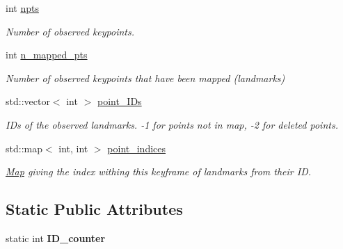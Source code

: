 \begin{DoxyCompactItemize}
\mbox{\label{classKeyframe_ab5b8f32d67271dde2b54214948c22c91}} 
int \hyperlink{classKeyframe_ab5b8f32d67271dde2b54214948c22c91}{npts}
\begin{DoxyCompactList}\small\item\em Number of observed keypoints. \end{DoxyCompactList}\item 
\mbox{\label{classKeyframe_a6f01f99a9ebe43e0c3de2beb7f3ae31a}} 
int \hyperlink{classKeyframe_a6f01f99a9ebe43e0c3de2beb7f3ae31a}{n\+\_\+mapped\+\_\+pts}
\begin{DoxyCompactList}\small\item\em Number of observed keypoints that have been mapped (landmarks) \end{DoxyCompactList}\item 
\mbox{\label{classKeyframe_a93cea4e722c086c6eef86d7413fb1d4e}} 
std\+::vector$<$ int $>$ \hyperlink{classKeyframe_a93cea4e722c086c6eef86d7413fb1d4e}{point\+\_\+\+I\+Ds}
\begin{DoxyCompactList}\small\item\em I\+Ds of the observed landmarks. -\/1 for points not in map, -\/2 for deleted points. \end{DoxyCompactList}\item 
\mbox{\label{classKeyframe_a513cda64443d5c30982d372ad1f386ab}} 
std\+::map$<$ int, int $>$ \hyperlink{classKeyframe_a513cda64443d5c30982d372ad1f386ab}{point\+\_\+indices}
\begin{DoxyCompactList}\small\item\em \hyperlink{classMap}{Map} giving the index withing this keyframe of landmarks from their ID. \end{DoxyCompactList}\end{DoxyCompactItemize}
\subsection*{Static Public Attributes}
\begin{DoxyCompactItemize}
\item 
\mbox{\label{classKeyframe_a320393f7f28d713fb62b5786c91031d3}} 
static int {\bfseries I\+D\+\_\+counter}
\end{DoxyCompactItemize}


